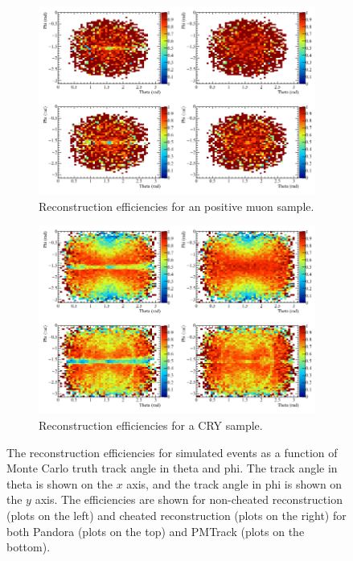 \begin{figure}[h!]
  \centering
  \begin{subfigure}{0.8\textwidth}
    \centering
    \includegraphics[width=\textwidth]{Effic_AntiMuon_500V_All_PhiTheta}
    \caption{Reconstruction efficiencies for an positive muon sample.}
    \label{fig:SimEffic_ThetaPhi_AMu}
  \end{subfigure}
  \begin{subfigure}{0.8\textwidth}
    \centering
    \includegraphics[width=\textwidth]{Effic_Cosmics_500V_All_PhiTheta}
    \caption{Reconstruction efficiencies for a CRY sample.}
    \label{fig:SimEffic_ThetaPhi_CRY}
  \end{subfigure}
  \caption[The reconstruction efficiencies for simulated events as a function of Monte Carlo truth track angle in theta and phi.]
          {The reconstruction efficiencies for simulated events as a function of Monte Carlo truth track angle in theta and phi. The track angle in theta is shown on the $x$ axis, and the track angle in phi is shown on the $y$ axis. The efficiencies are shown for non-cheated reconstruction (plots on the left) and cheated reconstruction (plots on the right) for both Pandora (plots on the top) and PMTrack (plots on the bottom).}
          \label{fig:SimEffic_ThetaPhi}
\end{figure}

